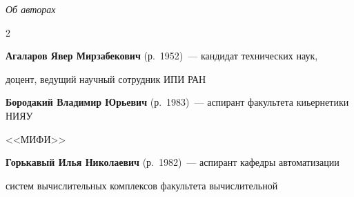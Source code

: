 
\begin{center}\LARGE

\textit{Об авторах}

\end{center}

\thispagestyle{empty}



\vspace*{24pt}



\begin{multicols}{2}












\noindent

\textbf{Агаларов Явер Мирзабекович} (р.\ 1952)~---  кандидат технических наук,

доцент, ведущий научный сотрудник ИПИ РАН



\medskip%








\vspace*{6pt}



\noindent

\textbf{Бородакий Владимир Юрьевич} (р.\ 1983)~--- аспирант факультета киьернетики НИЯУ

<<МИФИ>>





\vspace*{6pt}





\noindent

\textbf{Горькавый Илья Николаевич} (р.\ 1982)~--- аспирант кафедры автоматизации

сис\-тем вычислительных комплексов факультета вычислительной


\end{multicols}
